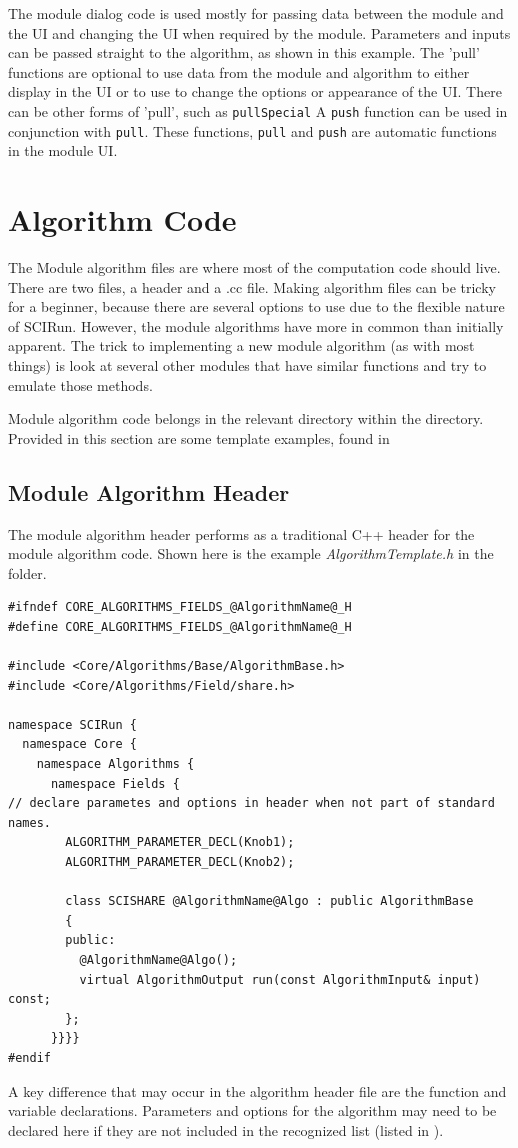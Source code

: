 \documentclass[fleqn,11pt,openany]{book}
\begin{document}
The module dialog code is used mostly for passing data between the module and the UI and changing the UI when required by the module.  
Parameters and inputs can be passed straight to the algorithm, as shown in this example.  
The 'pull' functions are optional to use data from the module and algorithm to either display in the UI or to use to change the options or appearance of the UI.  
There can be other forms of 'pull', such as \verb|pullSpecial|
A \verb|push| function can be used in conjunction with \verb|pull|.
These functions, \verb|pull| and \verb|push| are automatic functions in the module UI.

\section{Algorithm Code}
\label{sec:algo}

The Module algorithm files are where most of the computation code should live.  
There are two files, a header and a .cc file. 
Making algorithm files can be tricky for a beginner, because there are several options to use due to the flexible nature of SCIRun.  
However, the module algorithms have more in common than initially apparent.
The trick to implementing a new module algorithm (as with most things) is look at several other modules that have similar functions and try to emulate those methods.  

Module algorithm code belongs in the relevant directory within the \emph{} directory.
Provided in this section are some template examples, found in \emph{}

\subsection{Module Algorithm Header}

The module algorithm header performs as a traditional C++ header for the module algorithm code.  
Shown here is the example \emph{AlgorithmTemplate.h} in the \emph{} folder.
\begin{verbatim}
#ifndef CORE_ALGORITHMS_FIELDS_@AlgorithmName@_H
#define CORE_ALGORITHMS_FIELDS_@AlgorithmName@_H

#include <Core/Algorithms/Base/AlgorithmBase.h>
#include <Core/Algorithms/Field/share.h>

namespace SCIRun {
  namespace Core {
    namespace Algorithms {
      namespace Fields {
// declare parametes and options in header when not part of standard names. 
        ALGORITHM_PARAMETER_DECL(Knob1);
        ALGORITHM_PARAMETER_DECL(Knob2);

        class SCISHARE @AlgorithmName@Algo : public AlgorithmBase
        {
        public:
          @AlgorithmName@Algo();
          virtual AlgorithmOutput run(const AlgorithmInput& input) const; 
        };
      }}}}
#endif 
\end{verbatim}
A key difference that may occur in the algorithm header file are the function and variable declarations.
Parameters and options for the algorithm may need to be declared here if they are not included in the recognized list (listed in \emph{}).
\end{document}

